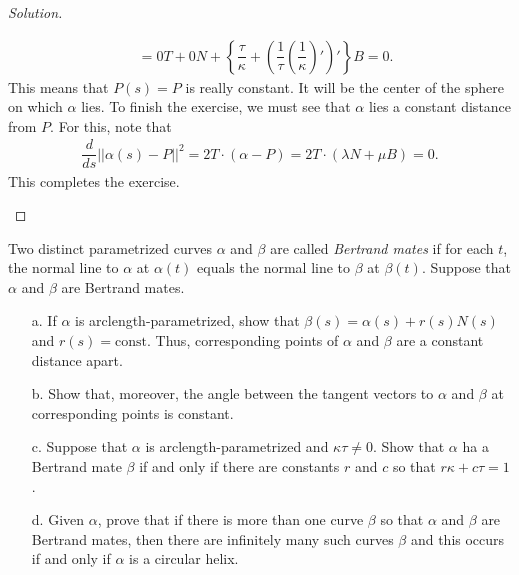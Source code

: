 \documentclass[Shifrin_Solutions_Spring_2018]{subfiles}
\begin{document}
\begin{proof}[Solution]
\begin{itemize}
\[\begin{split}
& = 0 T + 0 N + \left\{  \dfrac{\tau}{\kappa} 
 + \left(\dfrac{1}{\tau} \left(\dfrac{1}{\kappa}\right)' \right)' \right\} B = 0 .
\end{split}
\]
This means that $P(s) = P$ is really constant. It will be the center of the sphere on 
which $\alpha$ lies. To finish the exercise, we must see that $\alpha$ lies a constant 
distance from $P$. For this, note that
\[
\begin{split}
\dfrac{d}{ds} ||\alpha(s) - P||^2 = 2 T \cdot (\alpha-P) 
= 2 T \cdot ( \lambda N + \mu B) = 0.
\end{split}
\]
This completes the exercise.
\end{itemize}
\end{proof}

\clearpage


\begin{exercise}
Two distinct parametrized curves $\alpha$ and $\beta$ are called \emph{Bertrand mates} 
if for each $t$, the normal line to $\alpha$ at $\alpha(t)$ equals the normal line to 
$\beta$ at $\beta(t)$. Suppose that $\alpha$ and $\beta$ are Bertrand mates.
\begin{itemize}
\item[a.] If $\alpha$ is arclength-parametrized, show that $\beta(s) = \alpha(s) + r(s) N(s)$ 
and $r(s) = \mbox{const}$. Thus, corresponding points of $\alpha$ and $\beta$ are a constant 
distance apart.
\item[b.] Show that, moreover, the angle between the tangent vectors to $\alpha$ and $\beta$ 
at corresponding points is constant.
\item[c.] Suppose that $\alpha$ is arclength-parametrized and $\kappa\tau \neq 0$. Show that 
$\alpha$ ha a Bertrand mate $\beta$ if and only if there are constants $r$ and $c$ so that 
$r\kappa + c\tau =1$.
\item[d.] Given $\alpha$, prove that if there is more than one curve $\beta$ so that 
$\alpha$ and $\beta$ are Bertrand mates, then there are infinitely many such curves $\beta$ 
and this occurs if and only if $\alpha$ is a circular helix.
\end{itemize}
\end{exercise}
\end{document}
